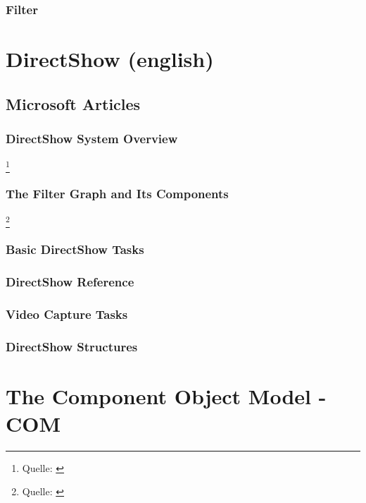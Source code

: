 \documentclass[10pt,
a4paper,
oneside,
titlepage,
bibtotocnumbered,	  %
liststotocnumbered]{scrbook}
\begin{document}
\section{Filter}


\part[DirectShow]{DirectShow (english)}
\chapter{Microsoft Articles}
\section{DirectShow System Overview }\footnote{Quelle: \cite{500}}

\section{The Filter Graph and Its Components}\footnote{Quelle: \cite{501}}


\section{Basic DirectShow Tasks}

\section{DirectShow Reference}


\section{Video Capture Tasks}

\section{DirectShow Structures}


\part{The Component Object Model - COM}
\end{document}
